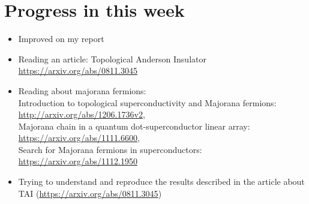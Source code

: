 \documentclass[12pt]{article}
\numberwithin{equation}{section}
\begin{document}
\newpage
\section{Progress in this week}
\begin{itemize}
  \item Improved on my report
  \item Reading an article: Topological Anderson Insulator \url{https://arxiv.org/abs/0811.3045}
  \item Reading about majorana fermions: 
  \\ Introduction to topological superconductivity and Majorana fermions: \url{http://arxiv.org/abs/1206.1736v2}, 
  \\ Majorana chain in a quantum dot-superconductor linear array: \url{https://arxiv.org/abs/1111.6600},
  \\ Search for Majorana fermions in superconductors: \url{https://arxiv.org/abs/1112.1950}
  \item Trying to understand and reproduce the results described in the article about TAI (\url{https://arxiv.org/abs/0811.3045})
\end{itemize}
\end{document}

